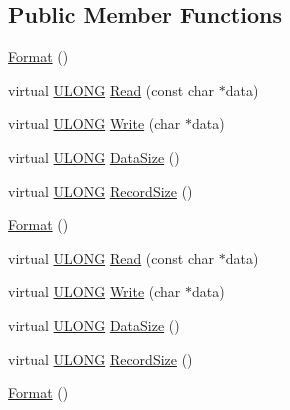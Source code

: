 \subsection*{Public Member Functions}
\begin{DoxyCompactItemize}
\item 
\hyperlink{struct_y_excel_1_1_workbook_1_1_format_a1630cf807454e40a2582af2ea5fbce37}{Format} ()
\item 
virtual \hyperlink{_basic_excel_8hpp_abe09d1bea023be6a07cbadde8e955435}{U\+L\+O\+N\+G} \hyperlink{struct_y_excel_1_1_workbook_1_1_format_a172838e613d1d3774624963fdf0d6665}{Read} (const char $\ast$data)
\item 
virtual \hyperlink{_basic_excel_8hpp_abe09d1bea023be6a07cbadde8e955435}{U\+L\+O\+N\+G} \hyperlink{struct_y_excel_1_1_workbook_1_1_format_a8652bfea3075ea73c5545ef9e5d296a6}{Write} (char $\ast$data)
\item 
virtual \hyperlink{_basic_excel_8hpp_abe09d1bea023be6a07cbadde8e955435}{U\+L\+O\+N\+G} \hyperlink{struct_y_excel_1_1_workbook_1_1_format_a6f6478a2ddcb3d1acf990129f0572c06}{Data\+Size} ()
\item 
virtual \hyperlink{_basic_excel_8hpp_abe09d1bea023be6a07cbadde8e955435}{U\+L\+O\+N\+G} \hyperlink{struct_y_excel_1_1_workbook_1_1_format_a80abdd727a02fbae4f694ed7f1d47f2d}{Record\+Size} ()
\item 
\hyperlink{struct_y_excel_1_1_workbook_1_1_format_a1630cf807454e40a2582af2ea5fbce37}{Format} ()
\item 
virtual \hyperlink{_basic_excel_8hpp_abe09d1bea023be6a07cbadde8e955435}{U\+L\+O\+N\+G} \hyperlink{struct_y_excel_1_1_workbook_1_1_format_afadb36256823fb38ce5cb7adb87020be}{Read} (const char $\ast$data)
\item 
virtual \hyperlink{_basic_excel_8hpp_abe09d1bea023be6a07cbadde8e955435}{U\+L\+O\+N\+G} \hyperlink{struct_y_excel_1_1_workbook_1_1_format_adb33f4818629caa14af0bc502135e4e1}{Write} (char $\ast$data)
\item 
virtual \hyperlink{_basic_excel_8hpp_abe09d1bea023be6a07cbadde8e955435}{U\+L\+O\+N\+G} \hyperlink{struct_y_excel_1_1_workbook_1_1_format_a6cd6d66b25022d520bec76eeb54a40a6}{Data\+Size} ()
\item 
virtual \hyperlink{_basic_excel_8hpp_abe09d1bea023be6a07cbadde8e955435}{U\+L\+O\+N\+G} \hyperlink{struct_y_excel_1_1_workbook_1_1_format_ad7c0f786c6aad1a64d3b4e55ebaa21cb}{Record\+Size} ()
\item 
\hyperlink{struct_y_excel_1_1_workbook_1_1_format_a1630cf807454e40a2582af2ea5fbce37}{Format} ()

\end{DoxyCompactItemize}
